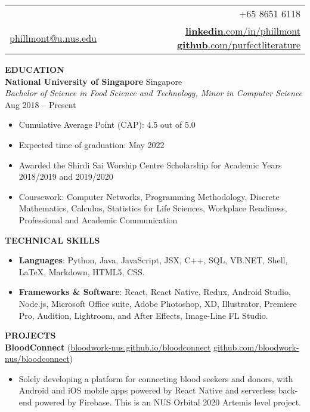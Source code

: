 \documentclass[a4paper, 11pt]{article}
\makeatletter
\newcommand{\interspace}{\vspace{7pt}}
\newcommand{\name}{Phillmont Muktar}
\newcommand{\cname}{\begin{CJK*}{UTF8}{zhsong}郑传期\end{CJK*}}
\newcommand{\tel}{+65 8651 6118}
\newcommand{\email}{\href{mailto:phillmont@u.nus.edu}{phillmont@u.nus.edu}}
\newcommand{\linkedin}{\href{http://linkedin.com/in/phillmont}{\textbf{linkedin}.com/in/phillmont}}
\newcommand{\github}{\href{http://github.com/purfectliterature}{\textbf{github}.com/purfectliterature}}
\makeatother
\begin{document}
	\sffamily
	
	\begin{tabularx}{\linewidth}{@{}X r@{}}
		{\Large \textbf{\name, \cname}} & \tel\\
		\email & \linkedin{} \textbar\textbar \space \github
	\end{tabularx}

	\interspace

	\textbf{\large EDUCATION} \hrulefill \\
	\textbf{National University of Singapore} \hfill Singapore\\
	\textit{Bachelor of Science in Food Science and Technology, Minor in Computer Science} \hfill Aug 2018 -- Present
	\begin{itemize}[leftmargin=*, noitemsep, topsep=0pt]
		\item Cumulative Average Point (CAP): 4.5 out of 5.0
		\item Expected time of graduation: May 2022
		\item Awarded the Shirdi Sai Worship Centre Scholarship for Academic Years 2018/2019 and 2019/2020
		\item Coursework: Computer Networks, Programming Methodology, Discrete Mathematics, Calculus, Statistics for Life Sciences, Workplace Readiness, Professional and Academic Communication
	\end{itemize}
	
	\interspace
	
	\textbf{\large TECHNICAL SKILLS} \hrulefill
	\begin{itemize}[leftmargin=*, noitemsep, topsep=0pt]
		\item \textbf{Languages}: Python, Java, JavaScript, JSX, C++, SQL, VB.NET, Shell, \LaTeX, Markdown, HTML5, CSS.
		\item \textbf{Frameworks \& Software}: React, React Native, Redux, Android Studio, Node.js, Microsoft Office suite, Adobe Photoshop, XD, Illustrator, Premiere Pro, Audition, Lightroom, and After Effects, Image-Line FL Studio.
	\end{itemize}

	\interspace
	
	\textbf{\large PROJECTS} \hrulefill \\
	\textbf{BloodConnect} (\href{https://bloodwork-nus.github.io/bloodconnect/}{bloodwork-nus.github.io/bloodconnect} \textbar\space \href{https://github.com/bloodwork-nus/bloodconnect}{github.com/bloodwork-nus/bloodconnect})
	\begin{itemize}[leftmargin=*, noitemsep, topsep=0pt]
		\item Solely developing a platform for connecting blood seekers and donors, with Android and iOS mobile apps powered by React Native and serverless back-end powered by Firebase. This is an NUS Orbital 2020 Artemis level project.
	\end{itemize}
	
\end{document}
